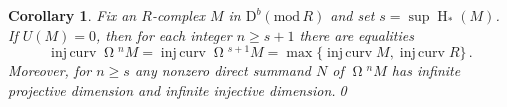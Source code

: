 \documentclass{amsart}
\numberwithin{equation}{section}
\theoremstyle{plain}
\newtheorem{corollary}[equation]{Corollary}
\theoremstyle{definition}
\theoremstyle{remark}
\newcommand{\dbcat}[1]{\mathrm{D}^b(\mathrm{mod}\,{#1})}
\newcommand{\hh}{\operatorname{H}}
\newcommand{\injcurv}{\operatorname{inj\,curv}}
\newcommand{\syz}{\operatorname{\Omega}\!}
\begin{document}
\begin{corollary}
Fix an $R$-complex $M$ in $\dbcat R$ and set $s=\sup\hh_*(M)$. If  $U(M)=0$, then for each integer $n\ge s+1$ there are equalities
\[
\injcurv \syz^n M = \injcurv \syz^{s+1}M =  \max\{\injcurv M, \injcurv R\}\,.
\]
Moreover, for $n\ge s$ any nonzero direct summand $N$ of  $\syz^nM$ has infinite projective dimension and infinite injective dimension.\qed
\end{corollary}




\newcommand{\noopsort}[1]{}
\providecommand{\bysame}{\leavevmode\hbox to3em{\hrulefill}\thinspace}
\providecommand{\MR}{\relax\ifhmode\unskip\space\fi MR }

\providecommand{\MRhref}[2]{%
  \href{http://www.ams.org/mathscinet-getitem?mr=#1}{#2}
}
\providecommand{\href}[2]{#2}
\end{document}
